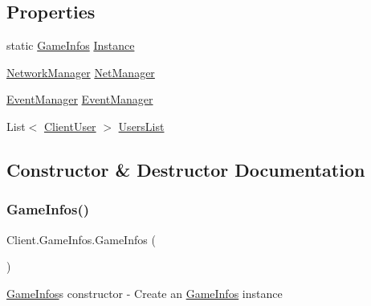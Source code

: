 \subsection*{Properties}
\begin{DoxyCompactItemize}
\item 
static \hyperlink{class_client_1_1_game_infos}{Game\+Infos} \hyperlink{class_client_1_1_game_infos_a09359e8cbd7142ba3b493250a06132a6}{Instance}
\item 
\hyperlink{class_client_1_1_network_manager}{Network\+Manager} \hyperlink{class_client_1_1_game_infos_a43ff6022f351a13ccdf8bf7c4abdf922}{Net\+Manager}
\item 
\hyperlink{class_client_1_1_event_manager}{Event\+Manager} \hyperlink{class_client_1_1_game_infos_ac6fb690cf0d16adee7f7354e2f0248bb}{Event\+Manager}
\item 
List$<$ \hyperlink{class_client_1_1_client_user}{Client\+User} $>$ \hyperlink{class_client_1_1_game_infos_a0fa9e2a98ced445c3c1ba6068cdcb995}{Users\+List}
\end{DoxyCompactItemize}


\subsection{Constructor \& Destructor Documentation}
\mbox{\label{class_client_1_1_game_infos_afc867ab95ff782307639ead71b2b109a}} 
\subsubsection{\texorpdfstring{Game\+Infos()}{GameInfos()}}
{\footnotesize\ttfamily Client.\+Game\+Infos.\+Game\+Infos (\begin{DoxyParamCaption}{ }\end{DoxyParamCaption})\hspace{0.3cm}{\ttfamily [inline]}}

\hyperlink{class_client_1_1_game_infos}{Game\+Infos}\textquotesingle{}s constructor -\/ Create an \hyperlink{class_client_1_1_game_infos}{Game\+Infos} instance 

